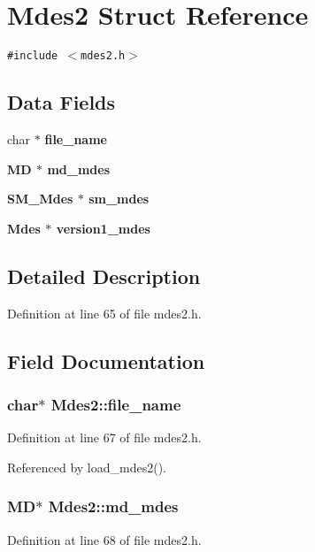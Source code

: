 \section{Mdes2 Struct Reference}
\label{structMdes2}
{\tt \#include $<$mdes2.h$>$}

\subsection*{Data Fields}
\begin{CompactItemize}
\item 
char $\ast$ \bf{file\_\-name}
\item 
\bf{MD} $\ast$ \bf{md\_\-mdes}
\item 
\bf{SM\_\-Mdes} $\ast$ \bf{sm\_\-mdes}
\item 
\bf{Mdes} $\ast$ \bf{version1\_\-mdes}
\end{CompactItemize}


\subsection{Detailed Description}




Definition at line 65 of file mdes2.h.

\subsection{Field Documentation}
\subsubsection{\setlength{\rightskip}{0pt plus 5cm}char$\ast$ \bf{Mdes2::file\_\-name}}\label{structMdes2_2be3556449ed251743d1d8b41db2988b}




Definition at line 67 of file mdes2.h.

Referenced by load\_\-mdes2().
\subsubsection{\setlength{\rightskip}{0pt plus 5cm}\bf{MD}$\ast$ \bf{Mdes2::md\_\-mdes}}\label{structMdes2_92e6c49a5973752554959a2691003c1b}




Definition at line 68 of file mdes2.h.

